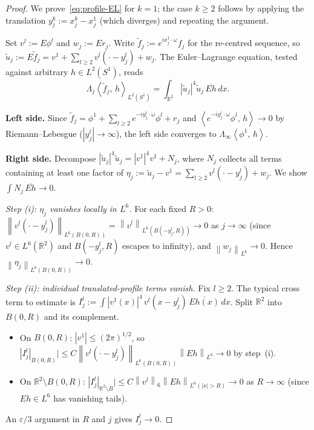 \documentclass[12pt]{article}
\theoremstyle{definition}
\theoremstyle{remark}
\newcommand{\R}{\mathbb{R}}
\newcommand{\norm}[1]{\left\|#1\right\|}
\newcommand{\ip}[2]{\left\langle #1,\, #2\right\rangle}
\begin{document}
\begin{proof}
  We prove~\eqref{eq:profile-EL} for $k=1$; the case $k\geq 2$
  follows by applying the translation $y_j^k:=x_j^k-x_j^1$
  (which diverges) and repeating the argument.

  Set $v^l:=E\phi^l$ and $w_j:=Er_j$.  Write
  $\tilde f_j:=e^{ix_j^1\cdot\omega}f_j$ for the re-centred
  sequence, so
  $\tilde u_j:=E\tilde f_j
  =v^1+\sum_{l\geq 2}v^l(\cdot-y_j^l)+w_j$.
  The Euler--Lagrange equation, tested against arbitrary
  $h\in L^2(S^1)$, reads
  \begin{equation}\label{eq:EL-tested}
    \Lambda_j\ip{\tilde f_j}{h}_{L^2(S^1)}
    = \int_{\R^2}|\tilde u_j|^4\tilde u_j\,\overline{Eh}\,dx.
  \end{equation}

  \textbf{Left side.}
  Since $\tilde f_j=\phi^1+\sum_{l\geq 2}e^{-iy_j^l\cdot\omega}\phi^l
  +r_j$ and $\ip{e^{-iy_j^l\cdot\omega}\phi^l}{h}\to 0$ by
  Riemann--Lebesgue ($|y_j^l|\to\infty$), the left side converges to
  $\Lambda_\infty\ip{\phi^1}{h}$.

  \textbf{Right side.}
  Decompose $|\tilde u_j|^4\tilde u_j=|v^1|^4v^1+N_j$, where
  $N_j$ collects all terms containing at least one factor of
  $\eta_j:=\tilde u_j-v^1=\sum_{l\geq 2}v^l(\cdot-y_j^l)+w_j$.
  We show $\int N_j\,\overline{Eh}\to 0$.

  \emph{Step (i): $\eta_j$ vanishes locally in $L^6$.}
  For each fixed $R>0$:
  $\norm{v^l(\cdot-y_j^l)}_{L^6(B(0,R))}
  =\norm{v^l}_{L^6(B(-y_j^l,R))}\to 0$ as $j\to\infty$ (since
  $v^l\in L^6(\R^2)$ and $B(-y_j^l,R)$ escapes to infinity), and
  $\norm{w_j}_{L^6}\to 0$.  Hence
  $\norm{\eta_j}_{L^6(B(0,R))}\to 0$.

  \emph{Step (ii): individual translated-profile terms vanish.}
  Fix $l\geq 2$.  The typical cross term to estimate is
  $I_j^l:=\int|v^1(x)|^4\,v^l(x-y_j^l)\,\overline{Eh(x)}\,dx$.
  Split $\R^2$ into $B(0,R)$ and its complement.
  \begin{itemize}
    \item On $B(0,R)$: $|v^1|\leq(2\pi)^{1/2}$, so
      $|I_j^l|_{B(0,R)}|\leq C\norm{v^l(\cdot-y_j^l)}_{L^6(B(0,R))}
      \norm{Eh}_{L^6}\to 0$ by step~(i).
    \item On $\R^2\setminus B(0,R)$:
      $|I_j^l|_{\R^2\setminus B}|\leq C\norm{v^l}_6
      \norm{Eh}_{L^6(|x|>R)}\to 0$ as $R\to\infty$ (since
      $Eh\in L^6$ has vanishing tails).
  \end{itemize}
  An $\varepsilon/3$ argument in $R$ and $j$ gives $I_j^l\to 0$.


\end{proof}
\end{document}
